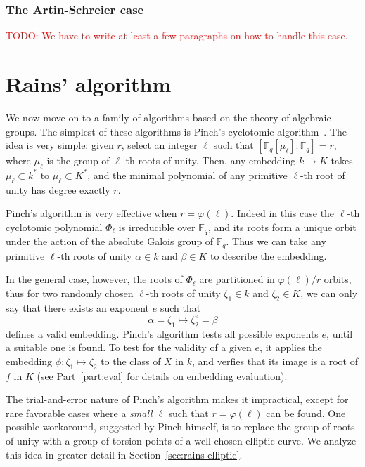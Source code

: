 \documentclass[12pt]{article}
\theoremstyle{plain}
\theoremstyle{definition}
\newcommand{\todo}[1]{\textcolor{red}{TODO: #1}}
\def\F{\ensuremath{\mathbb{F}}}
\def\euler{\ensuremath{\varphi}}
\newcounter{algorithm}
\begin{document}
\subsubsection{The Artin-Schreier case}
\label{sec:artin-schreier-case}

\todo{We have to write at least a few paragraphs on how to handle this case.}

\section{Rains' algorithm}

We now move on to a family of algorithms based on the theory of
algebraic groups. The simplest of these algorithms is Pinch's
cyclotomic algorithm~\cite{Pinch}. The idea is very simple: given $r$,
select an integer $\ell$ such that $[\F_q[\mu_\ell]:\F_q]=r$, where
$\mu_\ell$ is the group of $\ell$-th roots of unity.  Then, any
embedding $k\to K$ takes $\mu_\ell\subset k^\ast$ to $\mu_\ell\subset
K^\ast$, and the minimal polynomial of any primitive $\ell$-th root of
unity has degree exactly $r$.

Pinch's algorithm is very effective when $r=\euler(\ell)$. Indeed in
this case the $\ell$-th cyclotomic polynomial $\Phi_\ell$ is
irreducible over $\F_q$, and its roots form a unique orbit under the
action of the absolute Galois group of $\F_q$. Thus we can take any
primitive $\ell$-th roots of unity $\alpha\in k$ and $\beta\in K$ to
describe the embedding.

In the general case, however, the roots of $\Phi_\ell$ are partitioned
in $\euler(\ell)/r$ orbits, thus for two randomly chosen $\ell$-th
roots of unity $\zeta_1\in k$ and $\zeta_2\in K$, we can only say that
there exists an exponent $e$ such that
\begin{equation*}
  \alpha = \zeta_1 \mapsto \zeta_2^e = \beta
\end{equation*}
defines a valid embedding. Pinch's algorithm tests all possible
exponents $e$, until a suitable one is found. To test for the validity
of a given $e$, it applies the embedding $\phi:\zeta_1\mapsto\zeta_2$
to the class of $X$ in $k$, and verfies that its image is a root of
$f$ in $K$ (see Part~\ref{part:eval} for details on embedding
evaluation).

The trial-and-error nature of Pinch's algorithm makes it impractical,
except for rare favorable cases where a \emph{small} $\ell$ such that
$r=\euler(\ell)$ can be found. One possible workaround, suggested by
Pinch himself, is to replace the group of roots of unity with a group
of torsion points of a well chosen elliptic curve. We analyze this
idea in greater detail in Section~\ref{sec:rains-elliptic}.
\end{document}
